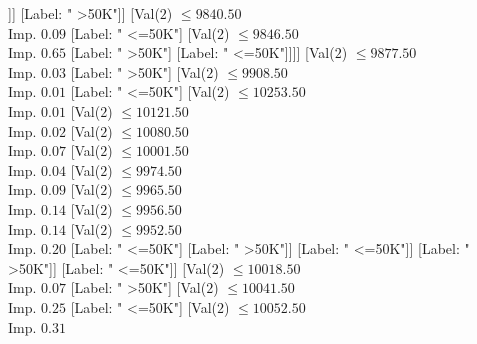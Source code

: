 \documentclass[margin=10pt]{standalone}
\begin{document}
\begin{forest}
																																										[Label: " <=50K"]]]
																																								[Label: " >50K"]]
																																							[Val($2$) $ \leq 9840.50$ \\ Imp. $0.09$
																																								[Label: " <=50K"]
																																								[Val($2$) $ \leq 9846.50$ \\ Imp. $0.65$
																																									[Label: " >50K"]
																																									[Label: " <=50K"]]]]
																																						[Val($2$) $ \leq 9877.50$ \\ Imp. $0.03$
																																							[Label: " >50K"]
																																							[Val($2$) $ \leq 9908.50$ \\ Imp. $0.01$
																																								[Label: " <=50K"]
																																								[Val($2$) $ \leq 10253.50$ \\ Imp. $0.01$
																																									[Val($2$) $ \leq 10121.50$ \\ Imp. $0.02$
																																										[Val($2$) $ \leq 10080.50$ \\ Imp. $0.07$
																																											[Val($2$) $ \leq 10001.50$ \\ Imp. $0.04$
																																												[Val($2$) $ \leq 9974.50$ \\ Imp. $0.09$
																																													[Val($2$) $ \leq 9965.50$ \\ Imp. $0.14$
																																														[Val($2$) $ \leq 9956.50$ \\ Imp. $0.14$
																																															[Val($2$) $ \leq 9952.50$ \\ Imp. $0.20$
																																																[Label: " <=50K"]
																																																[Label: " >50K"]]
																																															[Label: " <=50K"]]
																																														[Label: " >50K"]]
																																													[Label: " <=50K"]]
																																												[Val($2$) $ \leq 10018.50$ \\ Imp. $0.07$
																																													[Label: " >50K"]
																																													[Val($2$) $ \leq 10041.50$ \\ Imp. $0.25$
																																														[Label: " <=50K"]
																																														[Val($2$) $ \leq 10052.50$ \\ Imp. $0.31$

\end{forest}
\end{document}
